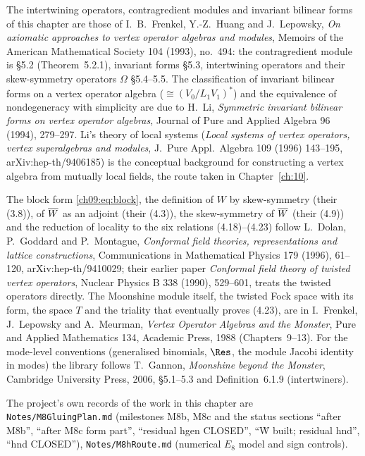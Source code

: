 The intertwining operators, contragredient modules and invariant bilinear forms of this chapter are
those of I.~B.~Frenkel, Y.-Z.~Huang and J.~Lepowsky, \emph{On axiomatic approaches to vertex operator
algebras and modules}, Memoirs of the American Mathematical Society 104 (1993), no.~494: the
contragredient module is \S5.2 (Theorem~5.2.1), invariant forms \S5.3, intertwining operators and
their skew-symmetry operators $\Omega$ \S5.4--5.5. The classification of invariant bilinear forms on
a vertex operator algebra ($\cong(V_0/L_1V_1)^*$) and the equivalence of nondegeneracy with
simplicity are due to H.~Li, \emph{Symmetric invariant bilinear forms on vertex operator algebras},
Journal of Pure and Applied Algebra 96 (1994), 279--297. Li's theory of local systems
(\emph{Local systems of vertex operators, vertex superalgebras and modules}, J.\ Pure Appl.\ Algebra
109 (1996) 143--195, arXiv:hep-th/9406185) is the conceptual background for constructing a vertex
algebra from mutually local fields, the route taken in Chapter~\ref{ch:10}.

The block form \eqref{ch09:eq:block}, the definition of $W$ by skew-symmetry (their (3.8)), of
$\overline{W}$ as an adjoint (their (4.3)), the skew-symmetry of $\overline{W}$ (their (4.9)) and the
reduction of locality to the six relations (4.18)--(4.23) follow L.~Dolan, P.~Goddard and
P.~Montague, \emph{Conformal field theories, representations and lattice constructions},
Communications in Mathematical Physics 179 (1996), 61--120, arXiv:hep-th/9410029; their earlier paper
\emph{Conformal field theory of twisted vertex operators}, Nuclear Physics B 338 (1990), 529--601,
treats the twisted operators directly. The Moonshine module itself, the twisted Fock space with its
form, the space $T$ and the triality that eventually proves (4.23), are in I.~Frenkel, J.~Lepowsky and
A.~Meurman, \emph{Vertex Operator Algebras and the Monster}, Pure and Applied Mathematics 134,
Academic Press, 1988 (Chapters~9--13). For the mode-level conventions (generalised binomials,
$\Res$, the module Jacobi identity in modes) the library follows T.~Gannon, \emph{Moonshine beyond
the Monster}, Cambridge University Press, 2006, \S5.1--5.3 and Definition~6.1.9 (intertwiners).

The project's own records of the work in this chapter are \texttt{Notes/M8GluingPlan.md}
(milestones M8b, M8c and the status sections ``after M8b'', ``after M8c form part'', ``residual hgen
CLOSED'', ``W̄ built; residual hnd'', ``hnd CLOSED''), \texttt{Notes/M8hRoute.md} (numerical
$E_8$ model and sign controls).
